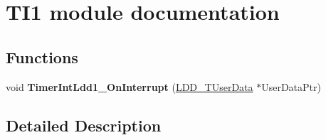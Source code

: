 \hypertarget{group___t_i1__module}{}\section{T\+I1 module documentation}
\label{group___t_i1__module}
\subsection*{Functions}
\begin{DoxyCompactItemize}
\item 
void {\bfseries Timer\+Int\+Ldd1\+\_\+\+On\+Interrupt} (\hyperlink{group___p_e___types__module_ga0b66a73f87238a782318aa0be7578e35}{L\+D\+D\+\_\+\+T\+User\+Data} $\ast$User\+Data\+Ptr)\hypertarget{group___t_i1__module_ga54442f7694fc9c73818c8e5985597415}{}\label{group___t_i1__module_ga54442f7694fc9c73818c8e5985597415}

\end{DoxyCompactItemize}


\subsection{Detailed Description}
